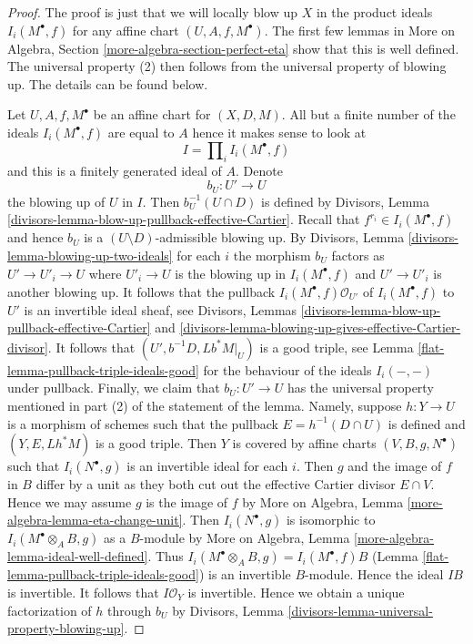 \begin{proof}

The proof is just that we will locally blow up $X$ in the product ideals
$I_i(M^\bullet, f)$ for any affine chart $(U, A, f, M^\bullet)$.
The first few lemmas in More on Algebra, Section
\ref{more-algebra-section-perfect-eta} show that this is well defined.
The universal property (2) then follows from the
universal property of blowing up.
The details can be found below.

\medskip\noindent
Let $U, A, f, M^\bullet$ be an affine chart for $(X, D, M)$.
All but a finite number of the ideals $I_i(M^\bullet, f)$ are
equal to $A$ hence it makes sense to look at
$$
I = \prod\nolimits_i I_i(M^\bullet, f)
$$
and this is a finitely generated ideal of $A$. Denote
$$
b_U : U' \to U
$$
the blowing up of $U$ in $I$. Then $b_U^{-1}(U \cap D)$ is defined by
Divisors, Lemma
\ref{divisors-lemma-blow-up-pullback-effective-Cartier}.
Recall that $f^{r_i} \in I_i(M^\bullet, f)$ and hence
$b_U$ is a $(U \setminus D)$-admissible blowing up.
By Divisors, Lemma \ref{divisors-lemma-blowing-up-two-ideals}
for each $i$ the morphism $b_U$ factors as $U' \to U'_i \to U$
where $U'_i \to U$ is the blowing up in $I_i(M^\bullet, f)$
and $U' \to U'_i$ is another blowing up. It follows that
the pullback $I_i(M^\bullet, f)\mathcal{O}_{U'}$
of $I_i(M^\bullet, f)$ to $U'$ is an invertible ideal sheaf, see
Divisors, Lemmas \ref{divisors-lemma-blow-up-pullback-effective-Cartier} and
\ref{divisors-lemma-blowing-up-gives-effective-Cartier-divisor}.
It follows that $(U', b^{-1}D, Lb^*M|_U)$ is a good triple, see
Lemma \ref{flat-lemma-pullback-triple-ideals-good}
for the behaviour of the ideals $I_i(-,-)$ under pullback.
Finally, we claim that $b_U : U' \to U$ has the universal property
mentioned in part (2) of the statement of the lemma. Namely, suppose
$h : Y \to U$ is a morphism of schemes such that
the pullback $E = h^{-1}(D \cap U)$ is defined and $(Y, E, Lh^*M)$
is a good triple. Then $Y$ is covered by affine charts
$(V, B, g, N^\bullet)$ such that $I_i(N^\bullet, g)$ is
an invertible ideal for each $i$. Then $g$ and the image of
$f$ in $B$ differ by a unit as they both cut out the effective
Cartier divisor $E \cap V$. Hence we may assume $g$ is the image of $f$ by
More on Algebra, Lemma \ref{more-algebra-lemma-eta-change-unit}.
Then $I_i(N^\bullet, g)$ is isomorphic to $I_i(M^\bullet \otimes_A B, g)$
as a $B$-module by More on Algebra, Lemma
\ref{more-algebra-lemma-ideal-well-defined}.
Thus $I_i(M^\bullet \otimes_A B, g) = I_i(M^\bullet, f)B$
(Lemma \ref{flat-lemma-pullback-triple-ideals-good})
is an invertible $B$-module.
Hence the ideal $IB$ is invertible. It follows that $I\mathcal{O}_Y$
is invertible. Hence we obtain a unique factorization of $h$ through
$b_U$ by Divisors, Lemma \ref{divisors-lemma-universal-property-blowing-up}.


\end{proof}
